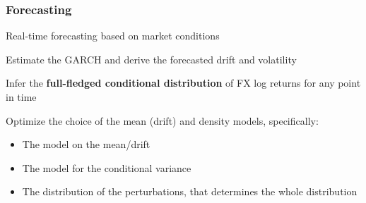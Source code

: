 \documentclass{beamer}
\newenvironment{wideitemize}{\itemize\addtolength{\itemsep}{10pt}}{\enditemize}
\begin{document}
\begin{frame}
  \frametitle{Forecasting}

  \begin{wideitemize}
      \item Real-time forecasting based on market conditions
    \item Estimate the GARCH and derive the forecasted drift and volatility
    \item Infer the \textbf{full-fledged conditional distribution} of FX log returns for any point
      in time
    \item Optimize the choice of the mean (drift) and density models, specifically:
      \begin{itemize}
      \item The model on the mean/drift
      \item The model for the conditional variance
      \item The distribution of the perturbations, that determines the whole distribution      
      \end{itemize}
  \end{wideitemize}  
\end{frame}



\begin{frame}
\end{frame}
\end{document}
